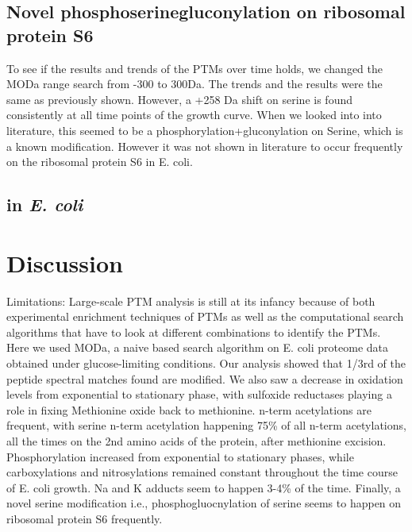 \documentclass[12pt]{article}
\begin{document}


\subsection{Novel phosphoserinegluconylation on ribosomal protein S6}
To see if the results and trends of the PTMs over time holds, we changed the MODa range search from -300 to 300Da. The trends and the results were the same as previously shown. However, a +258 Da shift on serine is found consistently at all time points of the growth curve. When we looked into into literature, this seemed to be a phosphorylation+gluconylation on Serine, which is a known modification. However it was not shown in literature to occur frequently on the ribosomal protein S6 in E. coli.

\subsection{ in \emph{E. coli}}

\section{Discussion}

Limitations:
Large-scale PTM analysis is still at its infancy because of both experimental enrichment techniques of PTMs as well as the computational search algorithms that have to look at different combinations to identify the PTMs. Here we used MODa, a naive based search algorithm on E. coli proteome data obtained under glucose-limiting conditions. Our analysis showed that 1/3rd of the peptide spectral matches found are modified. We also saw a decrease in oxidation levels from exponential to stationary phase, with sulfoxide reductases playing a role in fixing Methionine oxide back to methionine. n-term acetylations are frequent, with serine n-term acetylation happening 75\% of all n-term acetylations, all the times on the 2nd amino acids of the protein, after methionine excision. Phosphorylation increased from exponential to stationary phases, while carboxylations and nitrosylations remained constant throughout the time course of E. coli growth. Na and K adducts seem to happen 3-4\% of the time. Finally, a novel serine modification i.e., phosphogluocnylation of serine seems to happen on ribosomal protein S6 frequently.
\end{document}
